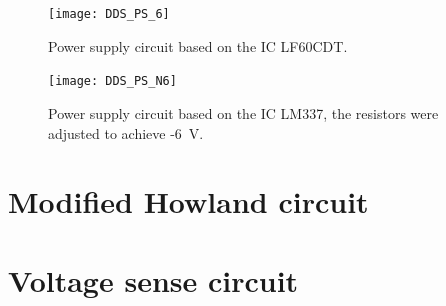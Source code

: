\begin{landscape}
	\begin{figure}[!htpb]
		\centering
		\texttt{[image: DDS\_PS\_6]}
		\caption[Positive power supply (\SI{6}{\volt}) for the differential amplifier]{Power supply circuit based on the IC LF60CDT.}
		\label{fig:DGA PS 6}
	\end{figure}
\end{landscape}

\begin{landscape}
	\begin{figure}[!htpb]
		\centering
		\texttt{[image: DDS\_PS\_N6]}
		\caption[Negative power supply (\SI{-6}{\volt}) for the differential amplifier]{Power supply circuit based on the IC LM337, the resistors were adjusted to achieve -\SI{6}{\volt}.}
		\label{fig:DGA PS -6}
	\end{figure}
\end{landscape}

\section*{Modified Howland circuit}

\section*{Voltage sense circuit}